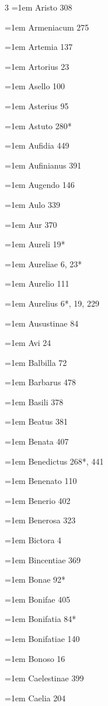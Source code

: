 \begin{multicols}{3}
\hangindent=1em Aristo 308\par
\hangindent=1em Armeniacum 275\par
\hangindent=1em Artemia 137\par
\hangindent=1em Artorius 23\par
\hangindent=1em Asello 100\par
\hangindent=1em Asterius 95\par
\hangindent=1em Astuto 280*\par
\hangindent=1em Aufidia 449\par
\hangindent=1em Aufinianus 391\par
\hangindent=1em Augendo 146\par
\hangindent=1em Aulo 339\par
\hangindent=1em Aur 370\par
\hangindent=1em Aureli 19*\par
\hangindent=1em Aureliae 6, 23*\par
\hangindent=1em Aurelio 111\par
\hangindent=1em Aurelius 6*, 19, 229\par
\hangindent=1em Ausustinae 84\par
\hangindent=1em Avi 24\par
\hangindent=1em Balbilla 72\par
\hangindent=1em Barbarus 478\par
\hangindent=1em Basili 378\par
\hangindent=1em Beatus 381\par
\hangindent=1em Benata 407\par
\hangindent=1em Benedictus 268*, 441\par
\hangindent=1em Benenato 110\par
\hangindent=1em Benerio 402\par
\hangindent=1em Benerosa 323\par
\hangindent=1em Bictora 4\par
\hangindent=1em Bincentiae 369\par
\hangindent=1em Bonae 92*\par
\hangindent=1em Bonifae 405\par
\hangindent=1em Bonifatia 84*\par
\hangindent=1em Bonifatiae 140\par
\hangindent=1em Bonoso 16\par
\hangindent=1em Caelestinae 399\par
\hangindent=1em Caelia 204\par

\end{multicols}
